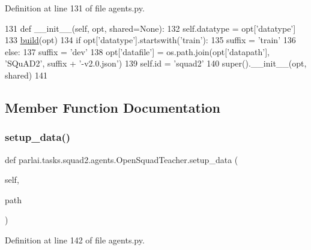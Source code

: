 Definition at line 131 of file agents.\+py.


\begin{DoxyCode}
131     \textcolor{keyword}{def }\_\_init\_\_(self, opt, shared=None):
132         self.datatype = opt[\textcolor{stringliteral}{'datatype'}]
133         \hyperlink{namespaceparlai_1_1mturk_1_1tasks_1_1talkthewalk_1_1download_a8c0fbb9b6dfe127cb8c1bd6e7c4e33fd}{build}(opt)
134         \textcolor{keywordflow}{if} opt[\textcolor{stringliteral}{'datatype'}].startswith(\textcolor{stringliteral}{'train'}):
135             suffix = \textcolor{stringliteral}{'train'}
136         \textcolor{keywordflow}{else}:
137             suffix = \textcolor{stringliteral}{'dev'}
138         opt[\textcolor{stringliteral}{'datafile'}] = os.path.join(opt[\textcolor{stringliteral}{'datapath'}], \textcolor{stringliteral}{'SQuAD2'}, suffix + \textcolor{stringliteral}{'-v2.0.json'})
139         self.id = \textcolor{stringliteral}{'squad2'}
140         super().\_\_init\_\_(opt, shared)
141 
\end{DoxyCode}


\subsection{Member Function Documentation}
\mbox{\label{classparlai_1_1tasks_1_1squad2_1_1agents_1_1OpenSquadTeacher_a7095abdf14125fc5cdae594fb63b71a0}} 
\subsubsection{\texorpdfstring{setup\+\_\+data()}{setup\_data()}}
{\footnotesize\ttfamily def parlai.\+tasks.\+squad2.\+agents.\+Open\+Squad\+Teacher.\+setup\+\_\+data (\begin{DoxyParamCaption}\item[{}]{self,  }\item[{}]{path }\end{DoxyParamCaption})}



Definition at line 142 of file agents.\+py.


